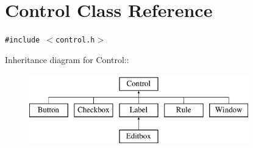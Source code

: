 \hypertarget{class_control}{
\section{Control Class Reference}
\label{class_control}
}
{\tt \#include $<$control.h$>$}

Inheritance diagram for Control::\begin{figure}[H]
\begin{center}
\leavevmode
\includegraphics[height=3cm]{class_control}
\end{center}
\end{figure}

